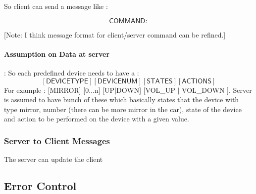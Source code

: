 So client can send a message like :

\[\textsf{COMMAND}:\]


[Note: I think message format for client/server command can be refined.]

\paragraph{Assumption on Data at server}:  So each predefined device needs to have a :
\[  [\textsf{DEVICETYPE}] [\textsf{DEVICENUM}] [\textsf{STATES}] [\textsf{ACTIONS}]\]
For example : [MIRROR] [0$\ldots$n] [UP$\mid$DOWN] [VOL\_UP $\mid$ VOL\_DOWN ]. Server is assumed to have bunch of these which basically states that the device with type mirror, number (there can be more mirror in the car), state of the device and action to be performed on the device with a given value.




\subsubsection{Server to Client Messages}
\label{sec:pdus:pdu:s_to_c}

The server can update the client 
\subsection{Error Control}
\label{sec:pdus:err}


